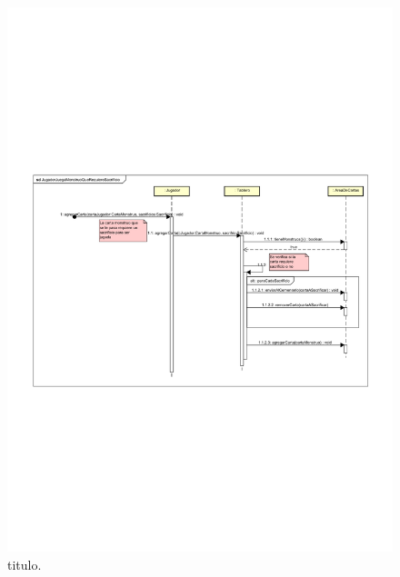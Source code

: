 \begin{figure}[H]
	\centering
	\includegraphics[scale=0.9]{includes/JugadorJuegaMonstruoQueRequiereSacrificio}
	\caption{titulo.}
	\label{JugadorJuegaMonstruoQueRequiereSacrificio}
\end{figure}
